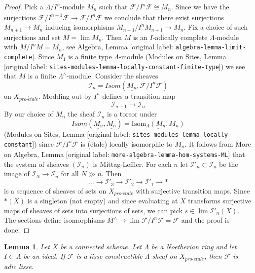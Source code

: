 \documentclass[10pt,a4paper]{article}
\theoremstyle{plain}
\newtheorem{lemma}[subsection]{Lemma}
\theoremstyle{definition}
\theoremstyle{remark}
\numberwithin{equation}{subsection}
\def\lim{\mathop{\mathrm{lim}}\nolimits}
\def\proetale{{pro\text{-}\acute{e}tale}}
\begin{document}
\begin{proof}
Pick a $\Lambda/I^n$-module $M_n$ such that
$\mathcal{F}/I^n\mathcal{F} \cong \underline{M_n}$.
Since we have the surjections
$\mathcal{F}/I^{n + 1}\mathcal{F} \to \mathcal{F}/I^n\mathcal{F}$
we conclude that there
exist surjections $M_{n + 1} \to M_n$ inducing isomorphisms
$M_{n + 1}/I^nM_{n + 1} \to M_n$. Fix a choice of such surjections
and set $M = \lim M_n$. Then $M$ is an $I$-adically complete
$\Lambda$-module with $M/I^nM = M_n$, see
Algebra, Lemma \textnormal{[original label: \nolinkurl{algebra-lemma-limit-complete}]}.
Since $M_1$ is a finite type $\Lambda$-module
(Modules on Sites, Lemma
\textnormal{[original label: \nolinkurl{sites-modules-lemma-locally-constant-finite-type}]})
we see that $M$ is a finite $\Lambda^\wedge$-module.
Consider the sheaves
$$
\mathcal{I}_n = \mathit{Isom}(\underline{M_n}, \mathcal{F}/I^n\mathcal{F})
$$
on $X_\proetale$. Modding out by $I^n$ defines a transition map
$$
\mathcal{I}_{n + 1} \longrightarrow \mathcal{I}_n
$$
By our choice of $M_n$ the sheaf $\mathcal{I}_n$ is a torsor under
$$
\mathit{Isom}(\underline{M_n}, \underline{M_n}) =
\underline{\text{Isom}_\Lambda(M_n, M_n)}
$$
(Modules on Sites, Lemma \textnormal{[original label: \nolinkurl{sites-modules-lemma-locally-constant}]})
since $\mathcal{F}/I^n\mathcal{F}$ is (\'etale) locally isomorphic
to $\underline{M_n}$. It follows from
More on Algebra, Lemma \textnormal{[original label: \nolinkurl{more-algebra-lemma-hom-systems-ML}]}
that the system of sheaves $(\mathcal{I}_n)$ is Mittag-Leffler.
For each $n$ let $\mathcal{I}'_n \subset \mathcal{I}_n$ be the
image of $\mathcal{I}_N \to \mathcal{I}_n$ for all $N \gg n$.
Then
$$
\ldots \to \mathcal{I}'_3 \to \mathcal{I}'_2 \to \mathcal{I}'_1 \to *
$$
is a sequence of sheaves of sets on $X_\proetale$ with surjective
transition maps. Since $*(X)$ is a singleton (not empty)
and since evaluating at $X$ transforms surjective maps of sheaves of sets
into surjections of sets, we can pick
$s \in \lim \mathcal{I}'_n(X)$. The sections define isomorphisms
$\underline{M}^\wedge \to \lim \mathcal{F}/I^n\mathcal{F} = \mathcal{F}$
and the proof is done.
\end{proof}

\begin{lemma}
\label{lemma-connected-lisse}
Let $X$ be a connected scheme. Let $\Lambda$ be a Noetherian ring and let
$I \subset \Lambda$ be an ideal. If $\mathcal{F}$ is a lisse
constructible $\Lambda$-sheaf on $X_\proetale$, then $\mathcal{F}$
is adic lisse.
\end{lemma}
\end{document}
